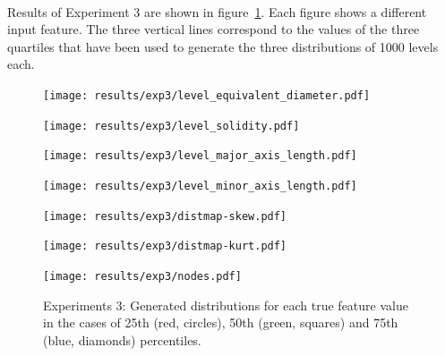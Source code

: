 \paragraph{} Results of Experiment 3 are shown in figure~\ref{fig:results-exp3-features}. Each figure shows a different input feature. The three vertical lines correspond to the values of the three quartiles that have been used to generate the three distributions of 1000 levels each. 

\begin{figure}[h!] 
	\begin{minipage}[b]{0.45\linewidth}
		\centering
		\texttt{[image: results/exp3/level\_equivalent\_diameter.pdf]} 
		\label{fig:results-exp3-level_equivalent_diameter}
	\end{minipage}
	\hfil
	\begin{minipage}[b]{0.45\linewidth}
		\centering
		\texttt{[image: results/exp3/level\_solidity.pdf]} 
		\label{fig:results-exp3-level_solidity}
	\end{minipage}
	
	\begin{minipage}[b]{0.45\linewidth}
		\centering
		\texttt{[image: results/exp3/level\_major\_axis\_length.pdf]} 
		\label{fig:results-exp3-level_major_axis_length}
	\end{minipage}
	\hfil
	\begin{minipage}[b]{0.45\linewidth}
		\centering
		\texttt{[image: results/exp3/level\_minor\_axis\_length.pdf]} 
		\label{fig:results-exp3-level_minor_axis_length}
	\end{minipage}
	
	\begin{minipage}[b]{0.45\linewidth}
		\centering
		\texttt{[image: results/exp3/distmap-skew.pdf]} 
		\label{fig:results-exp3-distmap-skew}
	\end{minipage}
	\hfil
	\begin{minipage}[b]{0.45\linewidth}
		\centering
		\texttt{[image: results/exp3/distmap-kurt.pdf]} 
		\label{fig:results-exp3-distmap-kurt}
	\end{minipage}
	
	\centering
	\begin{minipage}[b]{0.45\linewidth}
		\centering
		\texttt{[image: results/exp3/nodes.pdf]} 
		\label{fig:results-exp3-nodes}
	\end{minipage}

	
	\caption[Graphical results for experiments 3: Generated features distribution vs true percentiles]{Experiments 3: Generated distributions for each true feature value in the cases of 25th (red, circles), 50th (green, squares) and 75th (blue, diamonds) percentiles.}
	\label{fig:results-exp3-features}
\end{figure}

